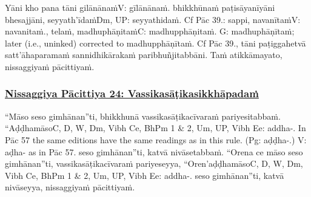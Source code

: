 Yāni kho pana tāni gilānānaṁ\makeatletter\hyperlink{endnote-appendix}\makeatother V: gīlānānaṁ. bhikkhūnaṁ paṭisāyanīyāni bhesajjāni, seyyath'īdaṁ\makeatletter\hyperlink{endnote-appendix}\makeatother Dm, UP: seyyathidaṁ. Cf Pāc 39.: sappi, navanītaṁ\makeatletter\hyperlink{endnote-appendix}\makeatother V: navanitaṁ., telaṁ, madhuphāṇitaṁ\makeatletter\hyperlink{endnote-appendix}\makeatother C: madhupphāṇitaṁ. G: madhuphāṇītaṁ; later (i.e., uninked) corrected to madhupphāṇītaṁ. Cf Pāc 39., tāni paṭiggahetvā satt'āhaparamaṁ sannidhikārakaṁ paribhuñjitabbāni. Taṁ atikkāmayato, nissaggiyaṁ pācittiyaṁ.



\subsubsection*{\hyperref[forf-exp24]{Nissaggiya Pācittiya 24: Vassikasāṭikasikkhāpadaṁ}}
\label{np24}

``Māso seso gimhānan''ti, bhikkhunā vassikasāṭikacīvaraṁ pariyesitabbaṁ. ``Aḍḍhamāso\makeatletter\hyperlink{endnote-appendix}\makeatother C, D, W, Dm, Vibh Ce, BhPm 1 & 2, Um, UP, Vibh Ee: addha-. In Pāc 57 the same editions have the same readings as in this
rule. (Pg: aḍḍha-.) V: aḍha- as in Pāc 57. seso gimhānan''ti, katvā nivāsetabbaṁ. ``Orena ce māso seso gimhānan''ti, vassikasāṭikacīvaraṁ pariyeseyya, ``Oren'aḍḍhamāso\makeatletter\hyperlink{endnote-appendix}\makeatother C, D, W, Dm, Vibh Ce, BhPm 1 & 2, Um, UP, Vibh Ee: addha-.  seso gimhānan''ti, katvā nivāseyya, nissaggiyaṁ pācittiyaṁ.



